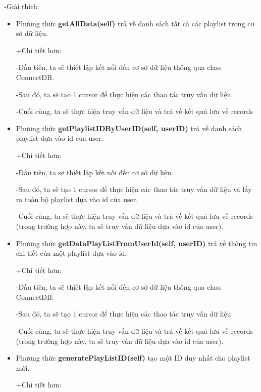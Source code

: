 \documentclass[a4paper]{article}
\begin{document}
\begin{flushleft}
	-Giải thích:
	\begin{itemize}
		\item Phương thức \textbf{getAllData(self)} trả về danh sách tất cả các playlist trong cơ sở dữ liệu.
		      \begin{flushleft}
			      +Chi tiết hơn:

			      -Đầu tiên, ta sẽ thiết lập kết nối đến cơ sở dữ liệu thông qua class ConnectDB.

			      -Sau đó, ta sẽ tạo 1 cursor để thực hiện các thao tác truy vấn dữ liệu.

			      -Cuối cùng, ta sẽ thực hiện truy vấn dữ liệu và trả về kết quả lưu về records
		      \end{flushleft}
		\item Phương thức \textbf{getPlaylistIDByUserID(self, userID)} trả về danh sách playlist dựa vào id của user.
		      \begin{flushleft}
			      +Chi tiết hơn:

			      -Đầu tiên, ta sẽ thiết lập kết nối đến cơ sở dữ liệu.

			      -Sau đó, ta sẽ tạo 1 cursor để thực hiện các thao tác truy vấn dữ liệu và lấy ra toàn bộ playlist dựa vào id của user.

			      -Cuối cùng, ta sẽ thực hiện truy vấn dữ liệu và trả về kết quả lưu về records (trong trường hợp này, ta sẽ truy vấn dữ liệu dựa vào id của user).
		      \end{flushleft}
		\item Phương thức \textbf{getDataPlayListFromUserId(self, userID)} trả về thông tin chi tiết của một playlist dựa vào id.
		      \begin{flushleft}
			      +Chi tiết hơn:

			      -Đầu tiên, ta sẽ thiết lập kết nối đến cơ sở dữ liệu thông qua class ConnectDB.

			      -Sau đó, ta sẽ tạo 1 cursor để thực hiện các thao tác truy vấn dữ liệu.

			      -Cuối cùng, ta sẽ thực hiện truy vấn dữ liệu và trả về kết quả lưu về records (trong trường hợp này, ta sẽ truy vấn dữ liệu dựa vào id của user).
		      \end{flushleft}
		\item Phương thức \textbf{generatePlayListID(self)} tạo một ID duy nhất cho playlist mới.
		      \begin{flushleft}
			      +Chi tiết hơn:


\end{flushleft}
\end{itemize}
\end{flushleft}
\end{document}
